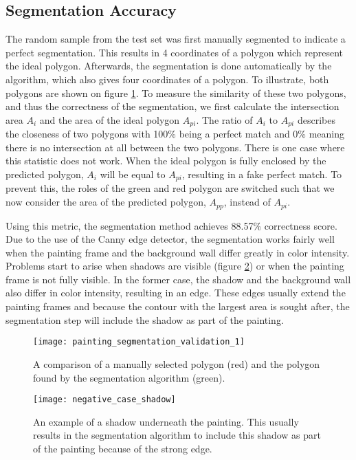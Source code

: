 \subsection{Segmentation Accuracy}
The random sample from the test set was first manually segmented to indicate a perfect segmentation. This results in 4 coordinates of a polygon which represent the ideal polygon. Afterwards, the segmentation is done automatically by the algorithm, which also gives four coordinates of a polygon. To illustrate, both polygons are shown on figure \ref{fig:painting_segmentation_validation_1}.
To measure the similarity of these two polygons, and thus the correctness of the segmentation, we first calculate the intersection area $A_i$ and the area of the ideal polygon $A_{pi}$. The ratio of $A_i$ to $A_{pi}$ describes the closeness of two polygons with 100\% being a perfect match and 0\% meaning there is no intersection at all between the two polygons. There is one case where this statistic does not work. When the ideal polygon is fully enclosed by the predicted polygon, $A_i$ will be equal to $A_{pi}$, resulting in a fake perfect match. To prevent this, the roles of the green and red polygon are switched such that we now consider the area of the predicted polygon, $A_{pp}$, instead of $A_{pi}$.

Using this metric, the segmentation method achieves 88.57\% correctness score. Due to the use of the Canny edge detector, the segmentation works fairly well when the painting frame and the background wall differ greatly in color intensity. Problems start to arise when shadows are visible (figure \ref{fig:negative_case_shadow}) or when the painting frame is not fully visible. In the former case, the shadow and the background wall also differ in color intensity, resulting in an edge. These edges usually extend the painting frames and because the contour with the largest area is sought after, the segmentation step will include the shadow as part of the painting.


\begin{figure}
	\centering
	\texttt{[image: painting\_segmentation\_validation\_1]}
	\caption{A comparison of a manually selected polygon (red) and the polygon found by the segmentation algorithm (green).}
	\label{fig:painting_segmentation_validation_1}
\end{figure}
	\begin{figure}
	\texttt{[image: negative\_case\_shadow]}
	\caption{An example of a shadow underneath the painting. This usually results in the segmentation algorithm to include this shadow as part of the painting because of the strong edge.}
	\label{fig:negative_case_shadow}
\end{figure}


